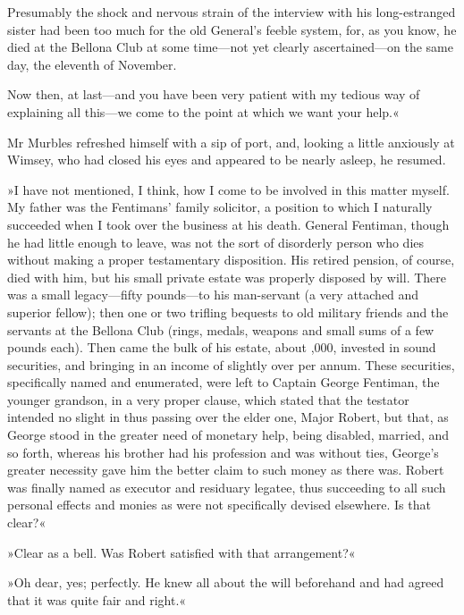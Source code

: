 Presumably the shock and nervous strain of the interview with his long-estranged sister had been too much for the old General's feeble system, for, as you know, he died at the Bellona Club at some time\allowbreak---\allowbreak not yet clearly ascertained\allowbreak---\allowbreak on the same day, the eleventh of November.

Now then, at last\allowbreak---\allowbreak and you have been very patient with my tedious way of explaining all this\allowbreak---\allowbreak we come to the point at which we want your help.«

Mr Murbles refreshed himself with a sip of port, and, looking a little anxiously at Wimsey, who had closed his eyes and appeared to be nearly asleep, he resumed.

»I have not mentioned, I think, how I come to be involved in this matter myself. My father was the Fentimans' family solicitor, a position to which I naturally succeeded when I took over the business at his death. General Fentiman, though he had little enough to leave, was not the sort of disorderly person who dies without making a proper testamentary disposition. His retired pension, of course, died with him, but his small private estate was properly disposed by will. There was a small legacy\allowbreak---\allowbreak fifty pounds\allowbreak---\allowbreak to his man-servant (a very attached and superior fellow); then one or two trifling bequests to old military friends and the servants at the Bellona Club (rings, medals, weapons and small sums of a few pounds each). Then came the bulk of his estate, about ,000, invested in sound securities, and bringing in an income of slightly over  per annum. These securities, specifically named and enumerated, were left to Captain George Fentiman, the younger grandson, in a very proper clause, which stated that the testator intended no slight in thus passing over the elder one, Major Robert, but that, as George stood in the greater need of monetary help, being disabled, married, and so forth, whereas his brother had his profession and was without ties, George's greater necessity gave him the better claim to such money as there was. Robert was finally named as executor and residuary legatee, thus succeeding to all such personal effects and monies as were not specifically devised elsewhere. Is that clear?«

»Clear as a bell. Was Robert satisfied with that arrangement?«

»Oh dear, yes; perfectly. He knew all about the will beforehand and had agreed that it was quite fair and right.«

